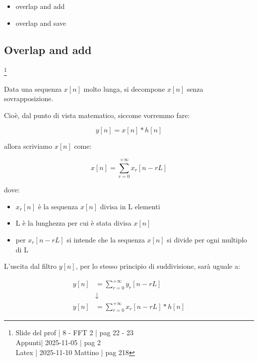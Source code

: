\begin{itemize}
    \item overlap and add 
    \item overlap and save 
\end{itemize}

\newpage 

\subsection{Overlap and add}

\footnote{ 
    Slide del prof | 8 - FFT 2 | pag 22 - 23\\
    Appunti| 2025-11-05 | pag 2 \\ 
    Latex | 2025-11-10 Mattino | pag 218 
} 

Data una sequenza $x \left[ n\right]$ molto lunga, si decompone $x \left[ n\right]$ senza sovrapposizione. \newline 

Cioè, dal punto di vista matematico, siccome vorremmo fare: 

{
    \Large 
    \begin{equation}
        y \left[ n\right] 
        = 
        x \left[ n\right]
        *
        h \left[ n\right]
    \end{equation}
}

allora scriviamo $x \left[ n\right]$ come: 

{
    \Large 
    \begin{equation}
        x \left[ n\right]
        = 
        \sum_{r = 0}^{+ \infty}
        x_r \left[ n - rL\right]
    \end{equation}
}

dove: 

\begin{itemize}
    \item $x_r \left[ n \right]$ è la sequenza $x \left[ n\right]$ divisa in L elementi
    \item L è la lunghezza per cui è stata divisa $x \left[ n\right]$
    \item per $x_r \left[ n - rL\right]$ si intende che la sequenza $x \left[ n\right]$ si divide per ogni multiplo di L
\end{itemize}

L'uscita dal filtro $y \left[ n\right]$, per lo stesso principio di suddivisione, sarà uguale a: 

{
    \Large 
    \begin{equation}
        \begin{split}
        y \left[ n\right]
        &= 
        \sum_{r = 0}^{+ \infty}
        y_r \left[ n - rL\right]
        \\
        &\downarrow
        \\
        y \left[ n\right]
        &= 
        \sum_{r = 0}^{+ \infty}
        x_r \left[ n - rL\right]
        * 
        h \left[ n\right]    
        \end{split}
    \end{equation}
} 

